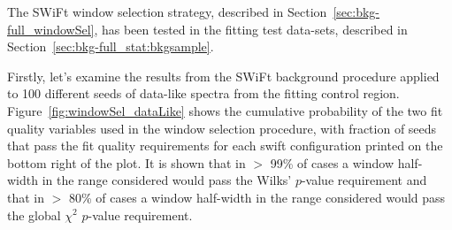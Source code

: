 The SWiFt window selection strategy, described in Section~\ref{sec:bkg-full_windowSel}, has been tested in the fitting test data-sets, described in Section~\ref{sec:bkg-full_stat:bkgsample}.


Firstly, let's examine the results from the SWiFt background procedure applied to 100 different seeds of data-like spectra from the fitting control region.
Figure~\ref{fig:windowSel_dataLike} shows the cumulative probability of the two fit quality variables used in the window selection procedure,
with fraction of seeds that pass the fit quality requirements for each swift configuration printed on the bottom right of the plot.
It is shown that in $>$ 99\% of cases a window half-width in the range considered would pass the Wilks' \mbox{$p$-value} requirement
and that in $>$ 80\% of cases a window half-width in the range considered would pass the global $\chi^{2}$ \mbox{$p$-value} requirement.

